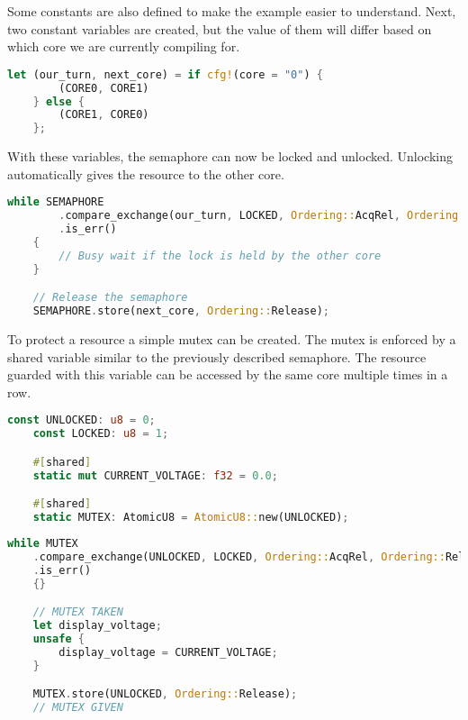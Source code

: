 Some constants are also defined to make the example easier to understand. Next, two constant variables are created, but the value of them will differ based on which core we are currently compiling for.

\begin{lstlisting}[language=Rust,frame=single,float=!ht,style=customrust,label={lst:sw-semaphore2},caption={Software Semaphore Core Specific Variables}]
    let (our_turn, next_core) = if cfg!(core = "0") {
        (CORE0, CORE1)
    } else {
        (CORE1, CORE0)
    };
\end{lstlisting}

With these variables, the semaphore can now be locked and unlocked. Unlocking automatically gives the resource to the other core.

\begin{lstlisting}[language=Rust,frame=single,float=!ht,style=customrust,label={lst:sw-semaphore3},caption={Software Semaphore Locking and Unlocking}]
    while SEMAPHORE
        .compare_exchange(our_turn, LOCKED, Ordering::AcqRel, Ordering::Relaxed)
        .is_err()
    {
        // Busy wait if the lock is held by the other core
    }

    // Release the semaphore
    SEMAPHORE.store(next_core, Ordering::Release);
\end{lstlisting}

To protect a resource a simple mutex can be created. The mutex is enforced by a shared variable similar to the previously described semaphore. The resource guarded with this variable can be accessed by the same core multiple times in a row.

\begin{lstlisting}[language=Rust,frame=single,float=!ht,style=customrust,label={lst:sw-mutex1},caption={Mutex For a Variable}]
    const UNLOCKED: u8 = 0;
    const LOCKED: u8 = 1;

    #[shared]
    static mut CURRENT_VOLTAGE: f32 = 0.0;

    #[shared]
    static MUTEX: AtomicU8 = AtomicU8::new(UNLOCKED);
\end{lstlisting}

\begin{lstlisting}[language=Rust,frame=single,float=!ht,style=customrust,label={lst:sw-mutex2},caption={Performing a Read Operation Using a Mutex}]
    while MUTEX
    .compare_exchange(UNLOCKED, LOCKED, Ordering::AcqRel, Ordering::Relaxed)
    .is_err()
    {}

    // MUTEX TAKEN
    let display_voltage;
    unsafe {
        display_voltage = CURRENT_VOLTAGE;
    }

    MUTEX.store(UNLOCKED, Ordering::Release);
    // MUTEX GIVEN
\end{lstlisting}

